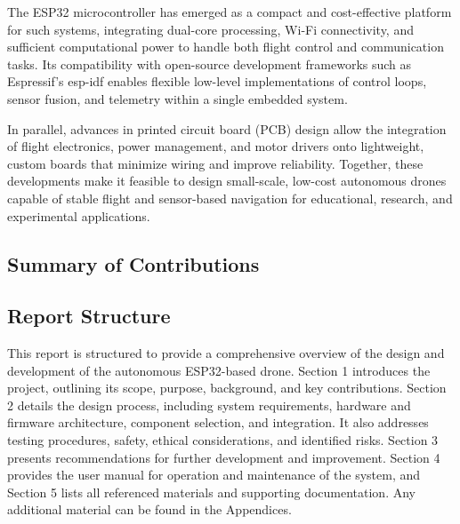 The ESP32 microcontroller has emerged as a compact and cost-effective platform for such systems, integrating dual-core processing, Wi-Fi connectivity, and sufficient computational power to handle both flight control and communication tasks. Its compatibility with open-source development frameworks such as Espressif’s \gls{esp-idf} enables flexible low-level implementations of control loops, sensor fusion, and telemetry within a single embedded system.

In parallel, advances in printed circuit board (PCB) design allow the integration of flight electronics, power management, and motor drivers onto lightweight, custom boards that minimize wiring and improve reliability. Together, these developments make it feasible to design small-scale, low-cost autonomous drones capable of stable flight and sensor-based navigation for educational, research, and experimental applications.

\subsection{Summary of Contributions}

\subsection{Report Structure}
This report is structured to provide a comprehensive overview of the design and development of the autonomous ESP32-based drone. Section 1 introduces the project, outlining its scope, purpose, background, and key contributions. Section 2 details the design process, including system requirements, hardware and firmware architecture, component selection, and integration. It also addresses testing procedures, safety, ethical considerations, and identified risks. Section 3 presents recommendations for further development and improvement. Section 4 provides the user manual for operation and maintenance of the system, and Section 5 lists all referenced materials and supporting documentation. Any additional material can be found in the Appendices.


